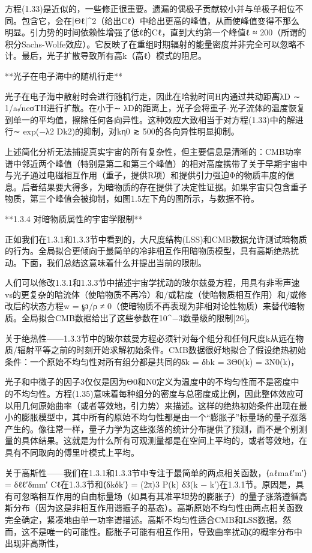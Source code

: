 方程(1.33)是近似的，一些修正很重要。遗漏的偶极子贡献较小并与单极子相位不同。包含它，会在|Θℓ|^2（给出Cℓ）中给出更高的峰值，从而使峰值变得不那么明显。引力势的时间依赖性增强了低ℓ的Cℓ，直到大约第一个峰值ℓ ≈ 200（所谓的积分Sachs-Wolfe效应）。它反映了在重组时期辐射的能量密度并非完全可以忽略不计。最后，光子扩散导致所有高k（高ℓ）模式的阻尼。

**光子在电子海中的随机行走**

光子在电子海中散射时会进行随机行走，因此在哈勃时间H内通过共动距离λD ∼ 1/a√neσTH进行扩散。在小于∼ λD的距离上，光子会将重子-光子流体的温度恢复到单一的平均值，擦除任何各向异性。这种效应大致相当于对方程(1.33)中的解进行∼ exp(−λ2 Dk2)的抑制，对kη0 ≳ 500的各向异性明显抑制。

上述简化分析无法捕捉真实宇宙的所有复杂性，但主要信息是清晰的：CMB功率谱中邻近两个峰值（特别是第二和第三个峰值）的相对高度携带了关于早期宇宙中与光子通过电磁相互作用（重子，提供R项）和提供引力强迫Φ的物质丰度的信息。后者结果要大得多，为暗物质的存在提供了决定性证据。如果宇宙只包含重子物质，第三个峰值会被抑制，如图1.5左下角的图所示，与数据不符。

**1.3.4 对暗物质属性的宇宙学限制**

正如我们在1.3.1和1.3.3节中看到的，大尺度结构(LSS)和CMB数据允许测试暗物质的行为。全局拟合更倾向于最简单的冷非相互作用暗物质模型，具有高斯绝热扰动。下面，我们总结这意味着什么并提出当前的限制。

人们可以修改1.3.1和1.3.3节中描述宇宙学扰动的玻尔兹曼方程，用具有非零声速vs的更复杂的暗流体（使暗物质不再冷）和/或粘度（使暗物质相互作用）和/或修改后的状态方程w = ℘/ρ ≠ 0（使暗物质不再表现为非相对论性物质）来替代暗物质。全局拟合CMB数据给出了这些参数在10^−3数量级的限制[26]。

关于绝热性——1.3.3节中的玻尔兹曼方程必须针对每个组分和任何尺度k从远在物质/辐射平等之前的时刻开始求解初始条件。CMB数据很好地拟合了假设绝热初始条件：一个原始不均匀性对所有组分都是共同的δk = δbk = 3Θ0(k) = 3N0(k)， 

光子和中微子的因子3仅仅是因为Θ0和N0定义为温度中的不均匀性而不是密度中的不均匀性。方程(1.35)意味着每种组分的密度与总密度成比例，因此整体效应可以用几何原始曲率（或者等效地，引力势）来描述。这样的绝热初始条件出现在最小的膨胀模型中，其中所有的原始不均匀性都是由一个“膨胀子”标量场的量子涨落产生的。像往常一样，量子力学为这些涨落的统计分布提供了预测，而不是个别测量的具体结果。这就是为什么所有可观测量都是在空间上平均的，或者等效地，在具有不同取向的傅里叶模式上平均。

关于高斯性——我们在1.3.1和1.3.3节中专注于最简单的两点相关函数，⟨aℓmaℓ′m′⟩ = δℓℓ′δmm′ Cℓ在1.3.3节和⟨δkδk′⟩ = (2π)3 P(k) δ3(k − k′)在1.3.1节。原因是，具有可忽略相互作用的自由标量场（如具有其准平坦势的膨胀子）的量子涨落遵循高斯分布（因为这是非相互作用谐振子的基态）。高斯原始不均匀性由两点相关函数完全确定，紧凑地由单一功率谱描述。高斯不均匀性适合CMB和LSS数据。然而，这不是唯一的可能性。膨胀子可能有相互作用，导致曲率扰动ζ的概率分布中出现非高斯性，





